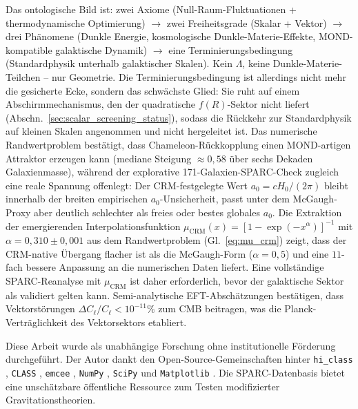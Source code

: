 \documentclass[aps,prd,twocolumn,superscriptaddress,nofootinbib]{revtex4-2}
\begin{document}
Das ontologische Bild ist: zwei Axiome (Null-Raum-Fluktuationen + thermodynamische Optimierung) $\to$ zwei Freiheitsgrade (Skalar + Vektor) $\to$ drei Ph\"anomene (Dunkle Energie, kosmologische Dunkle-Materie-Effekte, MOND-kompatible galaktische Dynamik) $\to$ eine Terminierungsbedingung (Standardphysik unterhalb galaktischer Skalen). Kein $\Lambda$, keine Dunkle-Materie-Teilchen -- nur Geometrie. Die Terminierungsbedingung ist allerdings nicht mehr die gesicherte Ecke, sondern das schw\"achste Glied: Sie ruht auf einem Abschirmmechanismus, den der quadratische $f(R)$-Sektor nicht liefert (Abschn.~\ref{sec:scalar_screening_status}), sodass die R\"uckkehr zur Standardphysik auf kleinen Skalen angenommen und nicht hergeleitet ist. Das numerische Randwertproblem best\"atigt, dass Chameleon-R\"uckkopplung einen MOND-artigen Attraktor erzeugen kann (mediane Steigung $\approx 0{,}58$ \"uber sechs Dekaden Galaxienmasse), w\"ahrend der explorative 171-Galaxien-SPARC-Check zugleich eine reale Spannung offenlegt: Der CRM-festgelegte Wert $a_0=cH_0/(2\pi)$ bleibt innerhalb der breiten empirischen $a_0$-Unsicherheit, passt unter dem McGaugh-Proxy aber deutlich schlechter als freies oder bestes globales $a_0$. Die Extraktion der emergierenden Interpolationsfunktion $\mu_{\mathrm{CRM}}(x) = [1 - \exp(-x^\alpha)]^{-1}$ mit $\alpha = 0{,}310 \pm 0{,}001$ aus dem Randwertproblem (Gl.~\ref{eq:mu_crm}) zeigt, dass der CRM-native \"Ubergang flacher ist als die McGaugh-Form ($\alpha = 0{,}5$) und eine $11$-fach bessere Anpassung an die numerischen Daten liefert. Eine vollst\"andige SPARC-Reanalyse mit $\mu_{\mathrm{CRM}}$ ist daher erforderlich, bevor der galaktische Sektor als validiert gelten kann. Semi-analytische EFT-Absch\"atzungen best\"atigen, dass Vektorst\"orungen $\Delta C_\ell/C_\ell < 10^{-11}\%$ zum CMB beitragen, was die Planck-Vertr\"aglichkeit des Vektorsektors etabliert.


\begin{acknowledgments}
Diese Arbeit wurde als unabh\"angige Forschung ohne institutionelle F\"orderung durchgef\"uhrt. Der Autor dankt den Open-Source-Gemeinschaften hinter \texttt{hi\_class} \cite{Zumalacarregui2017}, \texttt{CLASS} \cite{Blas2011}, \texttt{emcee} \cite{ForemanMackey2013}, \texttt{NumPy} \cite{Harris2020}, \texttt{SciPy} \cite{Virtanen2020} und \texttt{Matplotlib} \cite{Hunter2007}. Die SPARC-Datenbasis \cite{Lelli2016} bietet eine unsch\"atzbare \"offentliche Ressource zum Testen modifizierter Gravitationstheorien.
\end{acknowledgments}
\end{document}
